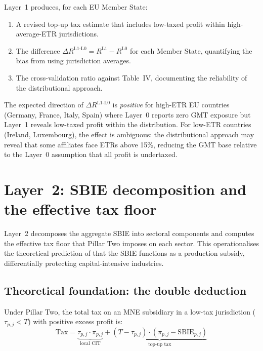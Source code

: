\documentclass[11pt,a4paper]{article}
\begin{document}
Layer~1 produces, for each EU Member State:
\begin{enumerate}
\item A revised top-up tax estimate that includes low-taxed profit within high-average-ETR jurisdictions.
\item The difference $\Delta R^{\text{L1-L0}} = R^{\text{L1}} - R^{\text{L0}}$ for each Member State, quantifying the bias from using jurisdiction averages.
\item The cross-validation ratio against Table~IV, documenting the reliability of the distributional approach.
\end{enumerate}

The expected direction of $\Delta R^{\text{L1-L0}}$ is \emph{positive} for high-ETR EU countries (Germany, France, Italy, Spain) where Layer~0 reports zero GMT exposure but Layer~1 reveals low-taxed profit within the distribution. For low-ETR countries (Ireland, Luxembourg), the effect is ambiguous: the distributional approach may reveal that some affiliates face ETRs above 15\%, reducing the GMT base relative to the Layer~0 assumption that all profit is undertaxed.

\section{Layer~2: SBIE decomposition and the effective tax floor}\label{sec:layer2}

Layer~2 decomposes the aggregate SBIE into sectoral components and computes the effective tax floor that Pillar Two imposes on each sector. This operationalises the theoretical prediction of \citet{schjelderup2024} that the SBIE functions as a production subsidy, differentially protecting capital-intensive industries.

\subsection{Theoretical foundation: the double deduction}\label{sec:double_deduction}

Under Pillar Two, the total tax on an MNE subsidiary in a low-tax jurisdiction ($\tau_{p,j} < T$) with positive excess profit is:
\begin{equation}\label{eq:total_tax}
\text{Tax} = \underbrace{\tau_{p,j} \cdot \pi_{p,j}}_{\text{local CIT}} + \underbrace{(T - \tau_{p,j}) \cdot (\pi_{p,j} - \text{SBIE}_{p,j})}_{\text{top-up tax}}
\end{equation}
\end{document}

